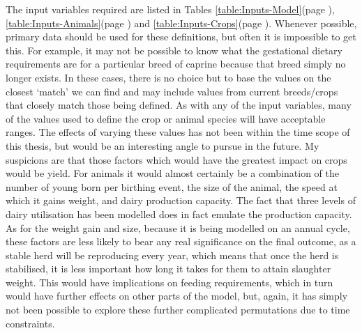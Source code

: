 The input variables required are listed in Tables \ref{table:Inputs-Model}(page \pageref{table:Inputs-Model}), \ref{table:Inputs-Animals}(page \pageref{table:Inputs-Animals}) and \ref{table:Inputs-Crops}(page \pageref{table:Inputs-Crops}).  Whenever possible, primary data should be used for these definitions, but often it is impossible to get this.  For example, it may not be possible to know what the gestational dietary requirements are for a particular breed of caprine because that breed simply no longer exists.  In these cases, there is no choice but to base the values on the closest `match'  we can find and may include values from current breeds/crops that closely match those being defined.  As with any of the input variables, many of the values used to define the crop or animal species will have acceptable ranges.  The effects of varying these values has not been within the time scope of this thesis, but would be an interesting angle to pursue in the future.  My suspicions are that those factors which would have the greatest impact on crops would be yield.  For animals it would almost certainly be a combination of the number of young born per birthing event, the size of the animal, the speed at which it gains weight, and dairy production capacity.  The fact that three levels of dairy utilisation has been modelled does in fact emulate the production capacity.  As for the weight gain and size, because it is being modelled on an annual cycle, these factors are less likely to bear any real significance on the final outcome, as a stable herd will be reproducing every year, which means that once the herd is stabilised, it is less important how long it takes for them to attain slaughter weight.  This would have implications on feeding requirements, which in turn would have further effects on other parts of the model, but, again, it has simply not been possible to explore these further complicated permutations due to time constraints.

